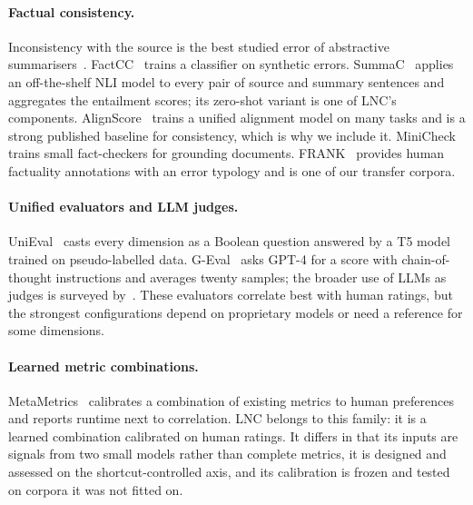 \paragraph{Factual consistency.} Inconsistency with the source is the best studied error of abstractive summarisers~\citep{maynez2020faithfulness}. FactCC~\citep{kryscinski2020factcc} trains a classifier on synthetic errors. SummaC~\citep{laban2022summac} applies an off-the-shelf NLI model to every pair of source and summary sentences and aggregates the entailment scores; its zero-shot variant is one of LNC's components. AlignScore~\citep{zha2023alignscore} trains a unified alignment model on many tasks and is a strong published baseline for consistency, which is why we include it. MiniCheck~\citep{tang2024minicheck} trains small fact-checkers for grounding documents. FRANK~\citep{pagnoni2021frank} provides human factuality annotations with an error typology and is one of our transfer corpora.

\paragraph{Unified evaluators and LLM judges.} UniEval~\citep{zhong2022unieval} casts every dimension as a Boolean question answered by a T5 model trained on pseudo-labelled data. G-Eval~\citep{liu2023geval} asks GPT-4 for a score with chain-of-thought instructions and averages twenty samples; the broader use of LLMs as judges is surveyed by~\citet{gu2024judgesurvey}. These evaluators correlate best with human ratings, but the strongest configurations depend on proprietary models or need a reference for some dimensions.

\paragraph{Learned metric combinations.} MetaMetrics~\citep{winata2025metametrics} calibrates a combination of existing metrics to human preferences and reports runtime next to correlation. LNC belongs to this family: it is a learned combination calibrated on human ratings. It differs in that its inputs are signals from two small models rather than complete metrics, it is designed and assessed on the shortcut-controlled axis, and its calibration is frozen and tested on corpora it was not fitted on.

